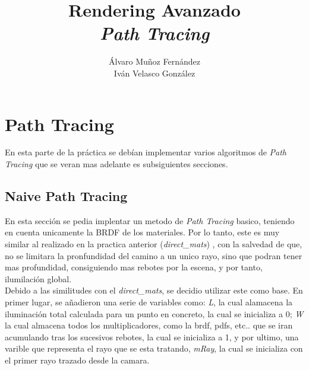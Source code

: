 \documentclass[10pt,oneside,a4paper]{article}
\begin{document}
\begin{titlepage}

\title{\Huge Rendering Avanzado  \\[0.7in] \LARGE \textit{Path Tracing}\\[3.6in]}
\date{}
\author{Álvaro Muñoz Fernández\\
Iván Velasco González}
\maketitle
\thispagestyle{empty}
\end{titlepage}

\section{Path Tracing}
En esta parte de la práctica se debían implementar varios algoritmos de \textit{ Path Tracing} que se veran mas adelante es subsiguientes secciones.
\subsection{Naive Path Tracing}
En esta sección se pedia implentar un metodo de \textit{Path Tracing} basico, teniendo en cuenta unicamente la BRDF de los materiales. Por lo tanto, este es muy similar al realizado en la practica anterior (\textit{direct\_mats}) , con la salvedad de que, no se limitara la pronfundidad del camino a un unico rayo, sino que podran tener mas profundidad, consiguiendo mas rebotes por la escena, y por tanto, ilumilación global.\\

Debido a las similitudes con el \textit{direct\_mats}, se decidio utilizar este como base. En primer lugar, se añadieron una serie de variables como: \textit{L}, la cual alamacena la iluminación total calculada para un punto en concreto, la cual se inicializa a 0; \textit{W} la cual almacena todos los multiplicadores, como la brdf, pdfs, etc.. que se iran acumulando tras los sucesivos rebotes, la cual se inicializa a 1, y por ultimo, una varible que representa el rayo que se esta tratando, \textit{mRay}, la cual se inicializa con el primer rayo trazado desde la camara.\\
\end{document}
